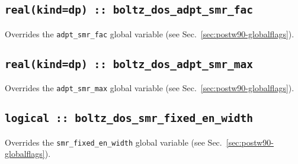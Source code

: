 \subsection[boltz\_dos\_adpt\_smr\_fac]{\tt real(kind=dp) :: boltz\_dos\_adpt\_smr\_fac}
Overrides the \verb#adpt_smr_fac# global variable (see
Sec.~\ref{sec:postw90-globalflags}).

\subsection[boltz\_dos\_adpt\_smr\_max]{\tt real(kind=dp) :: boltz\_dos\_adpt\_smr\_max}
Overrides the \verb#adpt_smr_max# global variable (see
Sec.~\ref{sec:postw90-globalflags}).

\subsection[boltz\_dos\_smr\_fixed\_en\_width]{\tt logical :: boltz\_dos\_smr\_fixed\_en\_width}
Overrides the \verb#smr_fixed_en_width# global variable (see
Sec.~\ref{sec:postw90-globalflags}).

%

%
%

%


